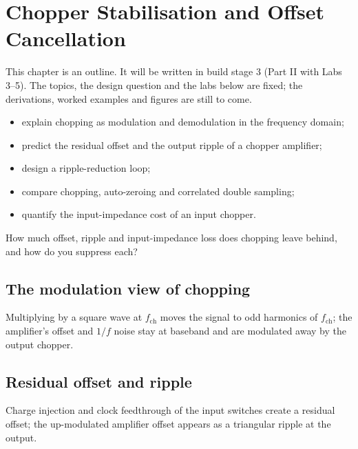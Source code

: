 \chapter{Chopper Stabilisation and Offset Cancellation}\label{ch:chopper}

\begin{specnote}
This chapter is an outline. It will be written in build stage 3 (Part II with Labs 3--5). The topics, the design question and the labs below are fixed; the derivations, worked examples and figures are still to come.
\end{specnote}

\begin{objectives}
\begin{itemize}
  \item explain chopping as modulation and demodulation in the frequency domain;
  \item predict the residual offset and the output ripple of a chopper amplifier;
  \item design a ripple-reduction loop;
  \item compare chopping, auto-zeroing and correlated double sampling;
  \item quantify the input-impedance cost of an input chopper.
\end{itemize}
\end{objectives}

\begin{insight}
How much offset, ripple and input-impedance loss does chopping leave behind, and how do you suppress each?
\end{insight}

\section{The modulation view of chopping}\label{sec:ch9-1}
Multiplying by a square wave at $f_\mathrm{ch}$ moves the signal to odd harmonics of $f_\mathrm{ch}$; the amplifier's offset and $1/f$ noise stay at baseband and are modulated away by the output chopper.

\section{Residual offset and ripple}\label{sec:ch9-2}
Charge injection and clock feedthrough of the input switches create a residual offset; the up-modulated amplifier offset appears as a triangular ripple at the output.

